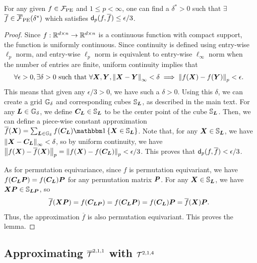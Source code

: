 \begin{lemma}
\label{lemma:part1}
For any given $f \in \mathcal{F}_{\rm PE}$ and $1 \leq p < \infty$, one can find a $\delta^* > 0$ such that $\exists$ $\overline f \in \overline {\mathcal{F}}_{\rm PE} (\delta^*)$ which satisfies $\mathsf{d}_p(f, \overline f) \leq \epsilon/3$.
\end{lemma}

\begin{proof}
Since $f: \mathbb{R}^{d \times n} \to \mathbb{R}^{d \times n}$ is a continuous function with compact support, the function is uniformly continuous. Since continuity is defined using entry-wise $\ell_p$ norm, and entry-wise $\ell_p$ norm is equivalent to entry-wise $\ell_\infty$ norm when the number of entries are finite, uniform continuity implies that
\begin{equation*}
    \forall \epsilon > 0, \exists \delta > 0 \text { such that } \forall {\bm{X}}, {\bm{Y}}, \left\|{{\bm{X}}-{\bm{Y}}}\right\|_\infty < \delta \implies \left\|{f({\bm{X}})-f({\bm{Y}})}\right\|_p < \epsilon.
\end{equation*}
This means that given any $\epsilon/3>0$, we have such a $\delta>0$. Using this $\delta$, we can create a grid ${\mathbb{G}}_{\delta}$ and corresponding cubes ${\mathbb{S}}_{\bm{L}}$, as described in the main text.
For any ${\bm{L}} \in {\mathbb{G}}_{\delta}$, we define ${\bm{C}}_{\bm{L}} \in {\mathbb{S}}_{\bm{L}}$ to be the center point of the cube ${\mathbb{S}}_{\bm{L}}$. Then, we can define a piece-wise constant approximation $\overline f(\mX) = \sum\nolimits_{\mL \in \sG_{\delta}} f(\mC_\mL) \indic{\mX \in \sS_\mL}$.
Note that, for any ${\bm{X}} \in {\mathbb{S}}_{\bm{L}}$, we have $\left\|{{\bm{X}} - {\bm{C}}_{\bm{L}}}\right\|_\infty < \delta$, so by uniform continuity, we have $\left\|{f({\bm{X}}) - \overline f({\bm{X}})}\right\|_p = \left\|{f({\bm{X}}) - f({\bm{C}}_{\bm{L}})}\right\|_p< \epsilon / 3$. 
This proves that $\mathsf{d}_p(f, \overline f) < \epsilon/3$.

As for permutation equivariance, since $f$ is permutation equivariant, we have $f({\bm{C}}_{\bm{L}} {\bm{P}}) = f({\bm{C}}_{\bm{L}}){\bm{P}}$ for any permutation matrix ${\bm{P}}$. For any ${\bm{X}} \in {\mathbb{S}}_{\bm{L}}$, we have ${\bm{X}} {\bm{P}} \in {\mathbb{S}}_{{\bm{L}} {\bm{P}}}$, so
\begin{equation*}
    \overline f({\bm{X}} {\bm{P}})
    = f({\bm{C}}_{{\bm{L}} {\bm{P}}}) = f({\bm{C}}_{\bm{L}} {\bm{P}}) = f({\bm{C}}_{\bm{L}}) {\bm{P}} = \overline f({\bm{X}}) {\bm{P}}.
\end{equation*}
Thus, the approximation $\overline f$ is also permutation equivariant. This proves the lemma.
\end{proof}

\subsection{Approximating $\overline{\mathcal{T}}^{2,1,1}$ with $\mathcal{T}^{2,1,4}$}
\label{appen:thm2-part3}

